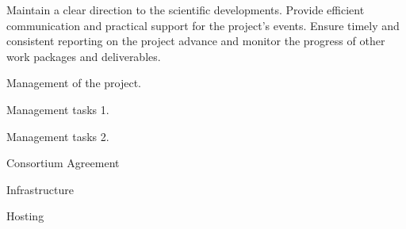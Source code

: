 \begin{workpackage}[id=management,type=MGT,wphases=0-48!.2,swsites,
  title=Project Management,short=Management,
  lead=KUL,KULRM=12,PAR2RM=6,PAR3RM=6]

\begin{wpobjectives}

Maintain a clear direction to the scientific developments.
%
Provide efficient communication and practical support for the project's events.
%
Ensure timely and consistent reporting on the project advance and monitor the
progress of other work packages and deliverables.

\end{wpobjectives}

\begin{wpdescription}
  Management of the project.
\end{wpdescription}

\begin{tasklist}
\begin{task}[title=Management tasks 1,id=mgt-task-1,lead=KUL,PM=18,wphases={0-48!0.25,0-24!0.25},
  partners={KUL,PAR2}]

  Management tasks 1.

\end{task}

\begin{task}[title=Management tasks 2,id=mgt-task-1,lead=PAR3,PM=6,wphases=24-48!0.25]

  Management tasks 2.

\end{task}
\end{tasklist}

\begin{wpdelivs}
  \begin{wpdeliv}[due=1,miles=start,id=ca,dissem=CO,nature=R,lead=KUL]{Consortium Agreement}
  \end{wpdeliv}
  \begin{wpdeliv}[due=1,miles=start,id=tickets,dissem=PU,nature=DEC,lead=KUL]{Infrastructure}
  \end{wpdeliv}
  \begin{wpdeliv}[due=6,miles=start,id=data,dissem=PU,nature=R,lead=PAR3]{Hosting}
  \end{wpdeliv}
\end{wpdelivs}

\end{workpackage}

